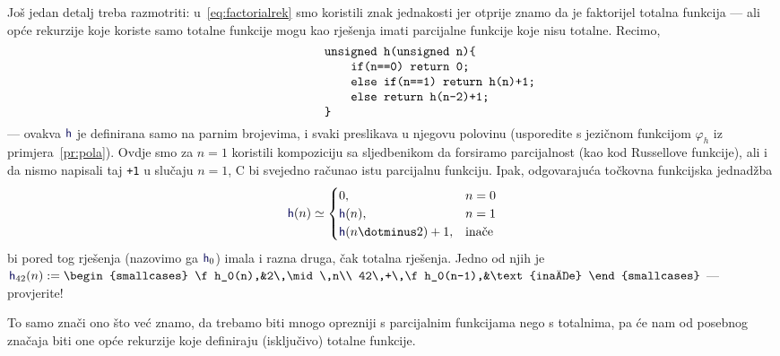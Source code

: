 Još jedan detalj treba razmotriti: u~\eqref{eq:factorialrek} smo koristili znak jednakosti jer otprije znamo da je faktorijel totalna funkcija --- ali opće rekurzije koje koriste samo totalne funkcije mogu kao rješenja imati parcijalne funkcije koje nisu totalne. Recimo,
\begin{equation}\begin{minipage}{0.8\textwidth}
\begin{verbatim}
                unsigned h(unsigned n){
                    if(n==0) return 0;
                    else if(n==1) return h(n)+1;
                    else return h(n-2)+1;
                }
\end{verbatim}
\end{minipage}\end{equation}
--- ovakva $\f h$ je definirana samo na parnim  brojevima, i svaki preslikava u njegovu polovinu (usporedite s jezičnom funkcijom $\varphi_h$ iz primjera~\ref{pr:pola}). Ovdje smo za $n=1$ koristili kompoziciju sa sljedbenikom da forsiramo parcijalnost (kao kod Russellove funkcije), ali i da nismo napisali taj \texttt{+1} u slučaju $n=1$, C bi svejedno računao istu parcijalnu funkciju. Ipak, odgovarajuća točkovna funkcijska jednadžba
\vspace{-1em}
\begin{equation}\label{eq:halfmany}
    \f h(n)\simeq\begin{cases}
        0,&n=0\\
        \f h(n),&n=1\\
        \f h(n\dotminus2)+1,&\text{inače}
    \end{cases}
\end{equation}
bi pored tog rješenja (nazovimo ga $\f h_0$) imala i razna druga, čak totalna rješenja. Jedno od njih je
$
    \f h_{42}(n):=\begin{smallcases}
        \f h_0(n),&2\,\mid\,n\\
        42\,+\,\f h_0(n-1),&\text{inače}
    \end{smallcases}
$ --- provjerite!

To samo znači ono što već znamo, da trebamo biti mnogo oprezniji s parcijalnim funkcijama nego s totalnima, pa će nam od posebnog značaja biti one opće rekurzije koje definiraju (isključivo) totalne funkcije.

